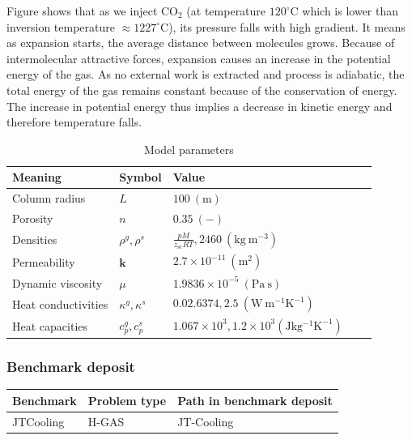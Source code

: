 Figure shows that as we inject $\mathrm {CO_2}$ (at temperature $120^{\circ}$C which is lower than inversion temperature $\approx 1227^{\circ}$C), its pressure falls with high gradient. It means as expansion starts, the average distance between molecules grows. Because of intermolecular attractive forces, expansion causes an increase in the potential energy of the gas. As no external work is extracted and process is adiabatic, the total energy of the gas remains constant because of the conservation of energy. The increase in potential energy thus implies a decrease in kinetic energy and therefore temperature falls.
\begin{table}[htbp]
\caption{Model parameters}
\label{tab:Material_parameters}\begin{tabular}{l*{3}{l}l}
\hline
Meaning & Symbol & Value \\ 
\hline
Column radius & $L$ & $100~(\mathrm {m})$\\
Porosity & $n$ & $0.35~(-)$ \\
Densities & $\rho^g,\rho^s$ & $\frac{p M}{z_{\mathrm {sc}} R T}, 2460~(\mathrm {kg~m^{-3}})$\\
Permeability & $\textbf{k}$ & $2.7\times 10^{-11}~(\mathrm {m^2})$\\
Dynamic viscosity & $\mu$ & $1.9836\times10^{-5}~(\mathrm {Pa~s})$\\
Heat conductivities & $\kappa^g,\kappa^s$ & $0.02.6374, 2.5~(\mathrm {W~m^{-1} K^{-1}})$\\
Heat capacities & $c_p^g,c_p^s$ & $1.067\times10^3, 1.2\times10^3 (\mathrm {J kg^{-1} K^{-1}})$\\
\hline
\end{tabular}
\end{table}

\subsubsection*{\upshape\textbf{Benchmark deposit}}
\begin{tabular}{|l|l|l|}
\hline
Benchmark & Problem type & Path in benchmark deposit \\
\hline
JTCooling& H-GAS & JT-Cooling \\
\hline
\end{tabular}
\clearpage

